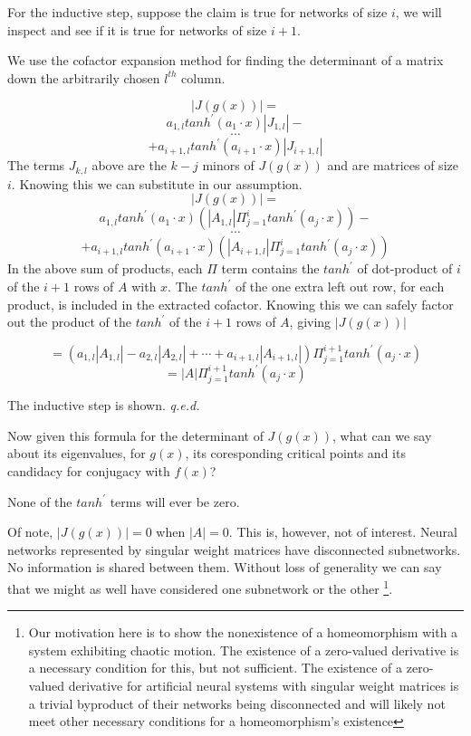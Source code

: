 \documentclass[12pt]{article}
\begin{document}
For the inductive step, suppose the claim is true for networks of size $i$,
we will inspect and see if it is true for networks of size $i+1$.

We use the cofactor expansion method for finding the determinant of a matrix
down the arbitrarily chosen $l^{th}$ column.

$$|J(g(x))|=$$$$
a_{1,l}tanh^{\prime}(a_{1}\cdot x)|J_{1,l}| -
$$ $$ \cdots $$ $$
+ a_{i+1,l}tanh^{\prime}(a_{i+1}\cdot x)|J_{i+1,l}|$$
The terms $J_{k,l}$ above are the $k-j$ minors of $J(g(x))$ and are matrices
of size $i$.  Knowing this we can substitute in our assumption.
$$|J(g(x))|=$$ $$
a_{1,l}tanh^{\prime}(a_{1}\cdot x)
(|A_{1,l}| \Pi_{j=1}^{i}tanh^{\prime}(a_{j} \cdot x)) -
$$ $$ \cdots $$ $$
+ a_{i+1,l}tanh^{\prime}(a_{i+1}\cdot x)
(|A_{i+1,l}| \Pi_{j=1}^{i}tanh^{\prime}(a_{j} \cdot x))$$
In the above sum of products, each $\Pi$ term contains the $tanh^{\prime}$ of
dot-product of $i$ of the $i+1$ rows of $A$ with $x$.  The $tanh^{\prime}$ of 
the one extra left out row, for each product, is included in the extracted 
cofactor.  Knowing this we can safely factor out the product of the 
$tanh^{\prime}$ of the $i+1$ rows of $A$, giving $|J(g(x))|$

$$=(a_{1,l}|A_{1,l}| - a_{2,l}|A_{2,l}| + \cdots + a_{i+1,l}|A_{i+1,l}|)
\Pi_{j=1}^{i+1}tanh^{\prime}(a_{j} \cdot x)$$
$$=|A| \Pi_{j=1}^{i+1}tanh^{\prime}(a_{j} \cdot x)$$

The inductive step is shown.  \textit{q.e.d.}

Now given this formula for the determinant of $J(g(x))$, what can we say
about its eigenvalues, for $g(x)$, its coresponding critical points and its 
candidacy for conjugacy with $f(x)$?

None of the $tanh^{\prime}$ terms will ever be zero.

Of note, $|J(g(x))|=0$ when $|A|=0$.  This is, however, not of interest.
Neural networks represented by singular weight matrices have disconnected
subnetworks.  No information is shared between them.  Without loss of generality
we can say that we might as well have considered one subnetwork or the other
\footnote{Our motivation here is to show the nonexistence of
a homeomorphism with a system exhibiting chaotic motion.  The existence of
a zero-valued derivative is a necessary condition for this, but not sufficient.
The existence of a zero-valued derivative for artificial
neural systems with singular weight matrices is a trivial byproduct of their
networks being disconnected and will likely not meet other necessary
conditions for a homeomorphism's existence }.
\end{document}
